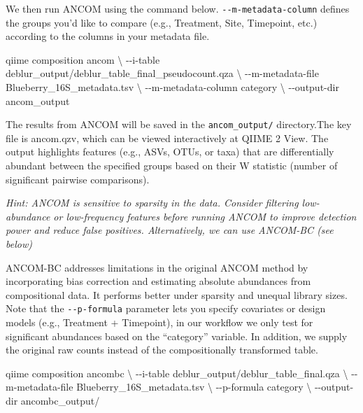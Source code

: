\documentclass[
]{book}
\newenvironment{Shaded}{\begin{snugshade}}{\end{snugshade}}
\newcommand{\AttributeTok}[1]{\textcolor[rgb]{0.13,0.29,0.53}{#1}}
\newcommand{\DataTypeTok}[1]{\textcolor[rgb]{0.13,0.29,0.53}{#1}}
\newcommand{\ExtensionTok}[1]{#1}
\newcommand{\NormalTok}[1]{#1}
\begin{document}
We then run ANCOM using the command below. \texttt{-\/-m-metadata-column} defines the groups you'd like to compare (e.g., Treatment, Site, Timepoint, etc.) according to the columns in your metadata file.

\begin{Shaded}
\begin{Highlighting}[]
\ExtensionTok{qiime}\NormalTok{ composition ancom }\DataTypeTok{\textbackslash{}}
  \AttributeTok{{-}{-}i{-}table}\NormalTok{ deblur\_output/deblur\_table\_final\_pseudocount.qza }\DataTypeTok{\textbackslash{}}
  \AttributeTok{{-}{-}m{-}metadata{-}file}\NormalTok{ Blueberry\_16S\_metadata.tsv }\DataTypeTok{\textbackslash{}}
  \AttributeTok{{-}{-}m{-}metadata{-}column}\NormalTok{ category }\DataTypeTok{\textbackslash{}}
  \AttributeTok{{-}{-}output{-}dir}\NormalTok{ ancom\_output}
\end{Highlighting}
\end{Shaded}

The results from ANCOM will be saved in the \texttt{ancom\_output/} directory.The key file is ancom.qzv, which can be viewed interactively at QIIME 2 View. The output highlights features (e.g., ASVs, OTUs, or taxa) that are differentially abundant between the specified groups based on their W statistic (number of significant pairwise comparisons).

\emph{Hint: ANCOM is sensitive to sparsity in the data. Consider filtering low-abundance or low-frequency features before running ANCOM to improve detection power and reduce false positives. Alternatively, we can use ANCOM-BC (see below)}

ANCOM-BC addresses limitations in the original ANCOM method by incorporating bias correction and estimating absolute abundances from compositional data. It performs better under sparsity and unequal library sizes. Note that the \texttt{-\/-p-formula} parameter lets you specify covariates or design models (e.g., Treatment + Timepoint), in our workflow we only test for significant abundances based on the ``category'' variable. In addition, we supply the original raw counts instead of the compositionally transformed table.

\begin{Shaded}
\begin{Highlighting}[]
\ExtensionTok{qiime}\NormalTok{ composition ancombc }\DataTypeTok{\textbackslash{}}
  \AttributeTok{{-}{-}i{-}table}\NormalTok{ deblur\_output/deblur\_table\_final.qza }\DataTypeTok{\textbackslash{}}
  \AttributeTok{{-}{-}m{-}metadata{-}file}\NormalTok{ Blueberry\_16S\_metadata.tsv }\DataTypeTok{\textbackslash{}}
  \AttributeTok{{-}{-}p{-}formula}\NormalTok{ category }\DataTypeTok{\textbackslash{}}
  \AttributeTok{{-}{-}output{-}dir}\NormalTok{ ancombc\_output/ }
\end{Highlighting}
\end{Shaded}
\end{document}

